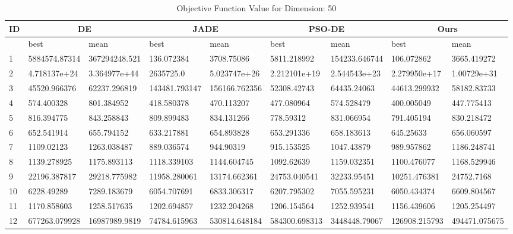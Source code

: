 \begingroup
\renewcommand\arraystretch{0.7}
\begin{table*}[t]
\centering
\caption{Objective Function Value for Dimension: 50}
 \begin{tabular}{|p{0.8cm}|p{1.6cm}|p{1.6cm}|p{1.6cm}|p{1.6cm}|p{1.6cm}|p{1.6cm}|p{1.6cm}|p{1.6cm}|} 
 \hline
 ID & \multicolumn{2}{c|}{DE} & \multicolumn{2}{c|}{JADE} & \multicolumn{2}{c|}{PSO-DE} & \multicolumn{2}{c|}{Ours} \\
 \hline
    & best & mean & best & mean & best & mean & best & mean \\ [0.5ex] 
 \hline
1  & 5884574.87314 & 367294248.521 & 136.072384 & 3708.75086 & 5811.218992 & 154233.646744 & 106.072862 & 3665.419272 \\ 
2  & 4.718137e+24 & 3.364977e+44 & 2635725.0 & 5.023747e+26 & 2.212101e+19 & 2.544543e+23 & 2.279950e+17 & 1.00729e+31 \\ 
3  & 45520.966376 & 62237.296819 & 143481.793147 & 156166.762356 & 52308.42743 & 64435.24063 & 44613.299932 & 58182.83733 \\ 
4  & 574.400328 & 801.384952 & 418.580378 & 470.113207 & 477.080964 & 574.528479 & 400.005049 & 447.775413 \\ 
5  & 816.394775 & 843.258843 & 809.899483 & 834.131266 & 778.59312 & 831.066954 & 791.405194 & 830.218472 \\ 
6  & 652.541914 & 655.794152 & 633.217881 & 654.893828 & 653.291336 & 658.183613 & 645.25633 & 656.060597 \\ 
7  & 1109.02123 & 1263.038487 & 889.036574 & 944.90319 & 915.153525 & 1047.43879 & 989.957862 & 1186.248741 \\ 
8  & 1139.278925 & 1175.893113 & 1118.339103 & 1144.604745 & 1092.62639 & 1159.032351 & 1100.476077 & 1168.529946 \\ 
9  & 22196.387817 & 29218.775982 & 11958.280061 & 13174.662361 & 24753.040541 & 32233.95451 & 10251.476381 & 24752.7168 \\ 
10  & 6228.49289 & 7289.183679 & 6054.707691 & 6833.306317 & 6207.795302 & 7055.595231 & 6050.434374 & 6609.804567 \\ 
11  & 1170.858603 & 1258.517635 & 1202.694857 & 1232.204268 & 1206.154564 & 1252.939541 & 1156.439606 & 1205.254497 \\ 
12  & 677263.079928 & 16987989.9819 & 74784.615963 & 530814.648184 & 584300.698313 & 3448448.79067 & 126908.215793 & 494471.075675 \\ 

\end{tabular}
\end{table*}
